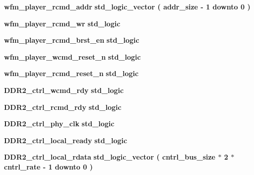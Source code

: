 \begin{DoxyCompactItemize}
\item 
{\bf wfm\+\_\+player\+\_\+rcmd\+\_\+addr} {\bfseries \textcolor{comment}{std\+\_\+logic\+\_\+vector}\textcolor{vhdlchar}{ }\textcolor{vhdlchar}{(}\textcolor{vhdlchar}{ }\textcolor{vhdlchar}{ }\textcolor{vhdlchar}{ }\textcolor{vhdlchar}{ }{\bfseries {\bf addr\+\_\+size}} \textcolor{vhdlchar}{-\/}\textcolor{vhdlchar}{ } \textcolor{vhdldigit}{1} \textcolor{vhdlchar}{ }\textcolor{keywordflow}{downto}\textcolor{vhdlchar}{ }\textcolor{vhdlchar}{ } \textcolor{vhdldigit}{0} \textcolor{vhdlchar}{ }\textcolor{vhdlchar}{)}\textcolor{vhdlchar}{ }} 
\item 
{\bf wfm\+\_\+player\+\_\+rcmd\+\_\+wr} {\bfseries \textcolor{comment}{std\+\_\+logic}\textcolor{vhdlchar}{ }} 
\item 
{\bf wfm\+\_\+player\+\_\+rcmd\+\_\+brst\+\_\+en} {\bfseries \textcolor{comment}{std\+\_\+logic}\textcolor{vhdlchar}{ }} 
\item 
{\bf wfm\+\_\+player\+\_\+wcmd\+\_\+reset\+\_\+n} {\bfseries \textcolor{comment}{std\+\_\+logic}\textcolor{vhdlchar}{ }} 
\item 
{\bf wfm\+\_\+player\+\_\+rcmd\+\_\+reset\+\_\+n} {\bfseries \textcolor{comment}{std\+\_\+logic}\textcolor{vhdlchar}{ }} 
\item 
{\bf D\+D\+R2\+\_\+ctrl\+\_\+wcmd\+\_\+rdy} {\bfseries \textcolor{comment}{std\+\_\+logic}\textcolor{vhdlchar}{ }} 
\item 
{\bf D\+D\+R2\+\_\+ctrl\+\_\+rcmd\+\_\+rdy} {\bfseries \textcolor{comment}{std\+\_\+logic}\textcolor{vhdlchar}{ }} 
\item 
{\bf D\+D\+R2\+\_\+ctrl\+\_\+phy\+\_\+clk} {\bfseries \textcolor{comment}{std\+\_\+logic}\textcolor{vhdlchar}{ }} 
\item 
{\bf D\+D\+R2\+\_\+ctrl\+\_\+local\+\_\+ready} {\bfseries \textcolor{comment}{std\+\_\+logic}\textcolor{vhdlchar}{ }} 
\item 
{\bf D\+D\+R2\+\_\+ctrl\+\_\+local\+\_\+rdata} {\bfseries \textcolor{comment}{std\+\_\+logic\+\_\+vector}\textcolor{vhdlchar}{ }\textcolor{vhdlchar}{(}\textcolor{vhdlchar}{ }\textcolor{vhdlchar}{ }\textcolor{vhdlchar}{ }\textcolor{vhdlchar}{ }{\bfseries {\bf cntrl\+\_\+bus\+\_\+size}} \textcolor{vhdlchar}{$\ast$}\textcolor{vhdlchar}{ } \textcolor{vhdldigit}{2} \textcolor{vhdlchar}{$\ast$}\textcolor{vhdlchar}{ }\textcolor{vhdlchar}{ }\textcolor{vhdlchar}{ }{\bfseries {\bf cntrl\+\_\+rate}} \textcolor{vhdlchar}{-\/}\textcolor{vhdlchar}{ } \textcolor{vhdldigit}{1} \textcolor{vhdlchar}{ }\textcolor{keywordflow}{downto}\textcolor{vhdlchar}{ }\textcolor{vhdlchar}{ } \textcolor{vhdldigit}{0} \textcolor{vhdlchar}{ }\textcolor{vhdlchar}{)}\textcolor{vhdlchar}{ }} 

\end{DoxyCompactItemize}
